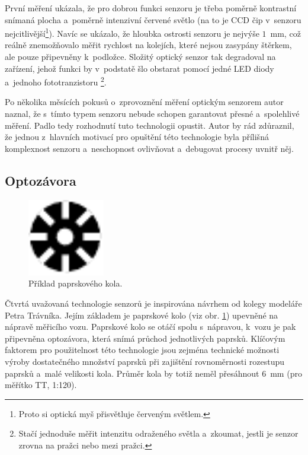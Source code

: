 První měření ukázala, že pro dobrou funkci senzoru je třeba poměrně kontrastní
snímaná plocha a~poměrně intenzivní červené světlo (na to je CCD čip v~senzoru
nejcitlivější\footnote{Proto si optická myš přisvětluje červeným světlem.}).
Navíc se ukázalo, že hloubka ostrosti senzoru je nejvýše $1$~mm, což reálně
znemožňovalo měřit rychlost na kolejích, které nejsou zasypány štěrkem, ale
pouze připevněny k~podložce. Složitý optický senzor tak degradoval na zařízení,
jehož funkci by v~podstatě šlo obstarat pomocí jedné LED diody a~jednoho
fototranzistoru \footnote{Stačí jednoduše měřit intenzitu odraženého světla
a~zkoumat, jestli je senzor zrovna na pražci nebo mezi pražci.}.

Po několika měsících pokusů o~zprovoznění měření optickým senzorem autor naznal,
že s~tímto typem senzoru nebude schopen garantovat přesné a~spolehlivé měření.
Padlo tedy rozhodnutí tuto technologii opustit. Autor by rád zdůraznil, že
jednou z~hlavních motivací pro opuštění této technologie byla přílišná
komplexnost senzoru a~neschopnost ovlivňovat a~debugovat procesy uvnitř něj.

\subsection{Optozávora}
\label{subsec:wsm-senzor-optozavora}

\begin{figure}[h]
\includegraphics[width=0.3\textwidth]{data/clonka.pdf}
\caption{Příklad paprskového kola.}
\label{fig:wheel}
\end{figure}

Čtvrtá uvažovaná technologie senzorů je inspirována návrhem od kolegy modeláře
Petra Trávníka. Jejím základem je paprskové kolo (viz obr. \ref{fig:wheel})
upevněné na nápravě měřicího vozu. Paprskové kolo se otáčí spolu s~nápravou,
k~vozu je pak připevněna optozávora, která snímá průchod jednotlivých paprsků.
Klíčovým faktorem pro použitelnost této technologie jsou zejména technické
možnosti výroby dostatečného množství paprsků při zajištění rovnoměrnosti
rozestupu paprsků a~malé velikosti kola. Průměr kola by totiž neměl přesáhnout
$6$~mm (pro měřítko TT, 1:120).

